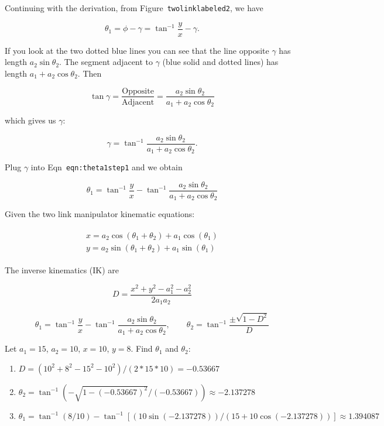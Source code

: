 Continuing with the derivation, from Figure~\texttt{twolinklabeled2}, we
have

\[\theta_1 = \phi - \gamma = \tan^{-1}\frac{y}{x} - \gamma .\]

If you look at the two dotted blue lines you can see that the line
opposite \(\gamma\) has length \(a_2\sin \theta_2\). The segment
adjacent to \(\gamma\) (blue solid and dotted lines) has length
\(a_1 + a_2\cos \theta_2\). Then

\[\tan \gamma =  \frac{\mbox{Opposite}}{\mbox{Adjacent}} = \frac{a_2\sin \theta_2}{a_1 + a_2\cos\theta_2}\]

which gives us \(\gamma\):

\[\gamma = \tan^{-1} \frac{a_2\sin \theta_2}{a_1 + a_2\cos\theta_2}.\]

Plug \(\gamma\) into Eqn~\texttt{eqn:theta1step1} and we obtain

\[\theta_1 = \tan^{-1}\frac{y}{x} - \tan^{-1} \frac{a_2\sin \theta_2}{a_1 + a_2\cos\theta_2}\]

Given the two link manipulator kinematic equations:

\[\begin{aligned}
\begin{matrix}
x = a_2\cos (\theta_1+\theta_2) + a_1 \cos (\theta_1)\\
y = a_2 \sin (\theta_1 +\theta_2) + a_1\sin (\theta_1)
\end{matrix}
\end{aligned}\]

The inverse kinematics (IK) are

\[D = \frac{x^2 + y^2 - a_1^2 - a_2^2}{2a_1a_2 }\]

\[\theta_1 = \tan^{-1}\frac{y}{x} - \tan^{-1} \frac{a_2\sin \theta_2}{a_1 + a_2\cos\theta_2}, \quad\quad
\theta_2 = \tan^{-1}\frac{\pm\sqrt{1-D^2}}{D}\]

Let \(a_1 = 15\), \(a_2 = 10\), \(x=10\), \(y=8\). Find \(\theta_1\) and
\(\theta_2\):

\begin{enumerate}
\tightlist
\item
  \(D = (10^2 + 8^2 - 15^2-10^2)/(2*15*10) = -0.53667\)
\item
  \(\theta_2 = \tan^{-1}(-\sqrt{1-(-0.53667)^2}/(-0.53667))\approx -2.137278\)
\item
  \(\theta_1 = \tan^{-1}(8/10)-\tan^{-1}[(10\sin(-2.137278))/(15+ 10\cos(-2.137278))] \approx 1.394087\)
\end{enumerate}

